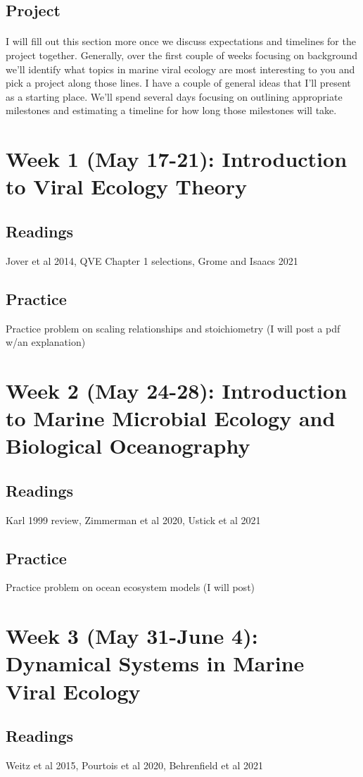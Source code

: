 \documentclass[11pt]{amsart}
\begin{document}
\subsection{Project} 
\paragraph{} I will fill out this section more once we discuss expectations and timelines for the project together. Generally, over the first couple of weeks focusing on background we'll identify what topics in marine viral ecology are most interesting to you and pick a project along those lines. I have a couple of general ideas that I'll present as a starting place. We'll spend several days focusing on outlining appropriate milestones and estimating a timeline for how long those milestones will take. 
\section{Week 1 (May 17-21): Introduction to Viral Ecology Theory}
\subsection{Readings} Jover et al 2014, QVE Chapter 1 selections, Grome and Isaacs 2021
\subsection{Practice} Practice problem on scaling relationships and stoichiometry (I will post a pdf w/an explanation)
\section{Week 2 (May 24-28): Introduction to Marine Microbial Ecology and Biological Oceanography}
\subsection{Readings} Karl 1999 review, Zimmerman et al 2020, Ustick et al 2021
\subsection{Practice} Practice problem on ocean ecosystem models (I will post)
\section{Week 3 (May 31-June 4): Dynamical Systems in Marine Viral Ecology}
\subsection{Readings} Weitz et al 2015, Pourtois et al 2020, Behrenfield et al 2021
\end{document}
